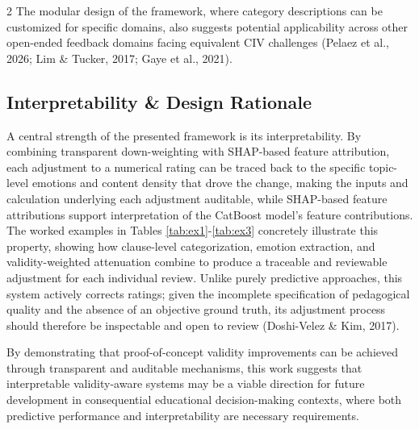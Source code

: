 \documentclass{article}
\begin{document}
\begin{multicols*}{2}
The modular design of the framework, where category descriptions can be customized for specific domains, also suggests potential applicability across other open-ended feedback domains facing equivalent CIV challenges (Pelaez et al., 2026; Lim \& Tucker, 2017; Gaye et al., 2021).

\subsection{Interpretability \& Design Rationale}
A central strength of the presented framework is its interpretability. By combining transparent down-weighting with
SHAP-based feature attribution, each adjustment to a numerical rating can be traced back to the specific topic-level
emotions and content density that drove the change, making the inputs and calculation underlying each adjustment auditable, while SHAP-based feature attributions support interpretation of the CatBoost model's feature contributions. The worked examples in Tables \ref{tab:ex1}-\ref{tab:ex3} concretely illustrate this property, showing how clause-level categorization, emotion extraction, and validity-weighted attenuation combine to produce a traceable and reviewable adjustment for each individual review. Unlike purely predictive approaches, this system actively corrects ratings; given the incomplete specification of pedagogical quality and the absence of an objective ground truth, its adjustment process should therefore be inspectable and open to review (Doshi-Velez \& Kim, 2017). 

By demonstrating that proof-of-concept validity improvements can be achieved through transparent and auditable mechanisms, this work suggests that interpretable validity-aware systems may be a viable direction for future development in consequential educational decision-making contexts, where both predictive performance and interpretability are necessary requirements.


\end{multicols*}
\end{document}
